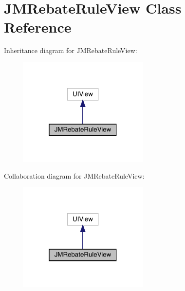 \hypertarget{interface_j_m_rebate_rule_view}{}\section{J\+M\+Rebate\+Rule\+View Class Reference}
\label{interface_j_m_rebate_rule_view}


Inheritance diagram for J\+M\+Rebate\+Rule\+View\+:\nopagebreak
\begin{figure}[H]
\begin{center}
\leavevmode
\includegraphics[width=184pt]{interface_j_m_rebate_rule_view__inherit__graph}
\end{center}
\end{figure}


Collaboration diagram for J\+M\+Rebate\+Rule\+View\+:\nopagebreak
\begin{figure}[H]
\begin{center}
\leavevmode
\includegraphics[width=184pt]{interface_j_m_rebate_rule_view__coll__graph}
\end{center}
\end{figure}
